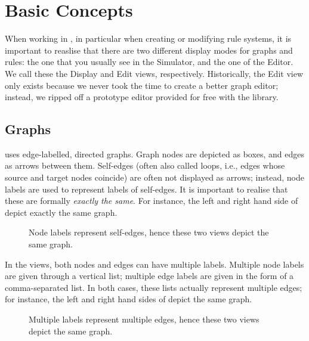 \section{Basic Concepts}

When working in \Groove{}, in particular when creating or modifying rule
systems, it is important to reaslise that there are two different display modes
for graphs and rules: the one that you usually see in the Simulator, and the
one of the Editor. We call these the Display and Edit views, respectively.
Historically, the Edit view only exists because we never took the time to
create a better graph editor; instead, we ripped off a prototype editor
provided for free with the \JGraph{} library.

\subsection{Graphs}

\Groove{} uses edge-labelled, directed graphs. Graph nodes are depicted as
boxes, and edges as arrows between them. Self-edges (often also called loops,
i.e., edges whose source and target nodes coincide) are often not displayed as
arrows; instead, node labels are used to represent labels of self-edges. It is
important to realise that these are formally \emph{exactly the same}. For
instance, the left and right hand side of  depict exactly the
same graph.

\begin{figure}[h]
\begin{center}
\qquad
{}
\end{center}
\caption{Node labels represent self-edges, hence these two views depict the
same graph.}
\end{figure}

In the \Groove{} views, both nodes and edges can have multiple labels. Multiple
node labels are given through a vertical list; multiple edge labels are given
in the form of a comma-separated list. In both cases, these lists actually
represent multiple edges; for instance, the left and right hand sides of
 depict the same graph.

\begin{figure}[h]
\begin{center}
\qquad
{}
\end{center}
\caption{Multiple labels represent multiple edges, hence these two views depict
the same graph.}
\end{figure}

